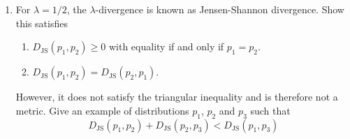 \documentclass[12pt]{article}
\begin{document}
\begin{enumerate}
\item For $\lambda=1/2$, the $\lambda$-divergence is known as Jensen-Shannon divergence. Show this satisfies 
\begin{enumerate}
\item $D_{\mathrm{JS}}(p_1,p_2)\ge 0$ with equality if and only if $p_1=p_2$.
\item $D_{\mathrm{JS}}(p_1,p_2)=D_{\mathrm{JS}}(p_2,p_1)$.
\end{enumerate}
However, it does not satisfy the triangular inequality and is therefore not a metric. Give an example of distributions $p_1$, $p_2$ and $p_3$ such that
\begin{equation}
D_{\mathrm{JS}}(p_1,p_2)+D_{\mathrm{JS}}(p_2,p_3)<D_{\mathrm{JS}}(p_1,p_3)
\end{equation}

\end{enumerate}
\end{document}

